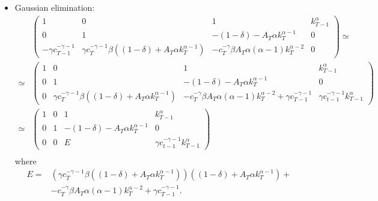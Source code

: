 \documentclass[compress]{beamer}
\begin{document}
\begin{frame}
  \begin{itemize}
  \item Gaussian elimination:
    \begin{align*}
      & \begin{pmatrix} 
        1 & 0 & 1 & k_{T-1}^\alpha \\
        0 & 1 & -(1-\delta) - A_T\alpha k_T^{\alpha-1} & 0 \\
    -\gamma c_{T-1}^{-\gamma-1} & \gamma c_{T}^{-\gamma-1}
    \beta\left((1-\delta) + A_T \alpha k_T^{\alpha-1}\right) &
    -c_T^{-\gamma} \beta A_T \alpha (\alpha-1) k_T^{\alpha-2} & 0
  \end{pmatrix} \simeq \\
  \simeq &   \begin{pmatrix} 
    1 & 0 & 1 & k_{T-1}^\alpha \\
    0 & 1 & -(1-\delta) - A_T\alpha k_T^{\alpha-1} & 0 \\
    0 & \gamma c_{T}^{-\gamma-1}
    \beta\left((1-\delta) + A_T \alpha k_T^{\alpha-1}\right) &    
    -c_T^{-\gamma} \beta A_T \alpha (\alpha-1) k_T^{\alpha-2} + \gamma
    c_{T-1}^{-\gamma-1} & \gamma c_{t-1}^{-\gamma-1} k_{T-1}^\alpha 
  \end{pmatrix}  \\
  \simeq &   \begin{pmatrix} 
    1 & 0 & 1 & k_{T-1}^\alpha \\
    0 & 1 & -(1-\delta) - A_T\alpha k_T^{\alpha-1} & 0 \\
    0 & 0 & E & \gamma c_{t-1}^{-\gamma-1} k_{T-1}^\alpha
  \end{pmatrix} \\
\end{align*}
where
\begin{align*}
  E = &\left(\gamma c_{T}^{-\gamma-1} \beta\left((1-\delta) + A_T
      \alpha k_T^{\alpha-1}\right)\right)
  \left((1-\delta) + A_T\alpha k_T^{\alpha-1} \right) + \\
  & -c_T^{-\gamma} \beta A_T \alpha (\alpha-1) k_T^{\alpha-2} + \gamma 
  c_{T-1}^{-\gamma-1}.
\end{align*}
\end{itemize}
\end{frame}
\end{document}
